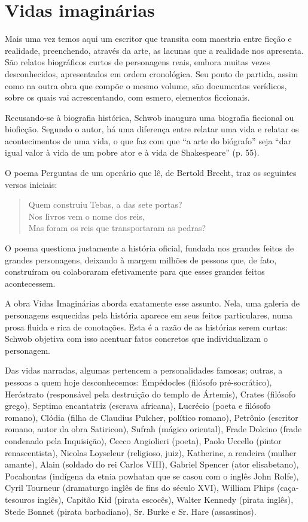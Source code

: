 \documentclass[12pt]{extarticle}
\begin{document}
\section{Vidas imaginárias}

Mais uma vez temos aqui um escritor que transita com maestria entre
ficção e realidade, preenchendo, através da arte, as lacunas que a
realidade nos apresenta. São relatos biográficos curtos de personagens
reais, embora muitas vezes desconhecidos, apresentados em ordem
cronológica. Seu ponto de partida, assim como na outra obra que compõe o
mesmo volume, são documentos verídicos, sobre os quais vai
acrescentando, com esmero, elementos ficcionais.

Recusando-se à biografia histórica, Schwob inaugura uma biografia
ficcional ou bioficção. Segundo o autor, há uma diferença entre relatar
uma vida e relatar os acontecimentos de uma vida, o que faz com que ``a
arte do biógrafo'' seja ``dar igual valor à vida de um pobre ator e à
vida de Shakespeare'' (p. 55).

O poema Perguntas de um operário que lê, de Bertold Brecht, traz os
seguintes versos iniciais:

\begin{verse}
Quem construiu Tebas, a das sete portas?\\
Nos livros vem o nome dos reis,\\
Mas foram os reis que transportaram as pedras?\\
\end{verse}

O poema questiona justamente a história oficial, fundada nos grandes
feitos de grandes personagens, deixando à margem milhões de pessoas que,
de fato, construíram ou colaboraram efetivamente para que esses grandes
feitos acontecessem.

A obra Vidas Imaginárias aborda exatamente esse assunto. Nela, uma
galeria de personagens esquecidas pela história aparece em seus feitos
particulares, numa prosa fluida e rica de conotações. Esta é a razão de
as histórias serem curtas: Schwob objetiva com isso acentuar fatos
concretos que individualizam o personagem.

Das vidas narradas, algumas pertencem a personalidades famosas; outras,
a pessoas a quem hoje desconhecemos: Empédocles (filósofo
pré-socrático), Heróstrato (responsável pela destruição do templo de
Ártemis), Crates (filósofo grego), Septima encantatriz (escrava
africana), Lucrécio (poeta e filósofo romano), Clódia (filha de Claudius
Pulcher, político romano), Petrônio (escritor romano, autor da obra
Satiricon), Sufrah (mágico oriental), Frade Dolcino (frade condenado
pela Inquisição), Cecco Angiolieri (poeta), Paolo Uccello (pintor
renascentista), Nicolas Loyseleur (religioso, juiz), Katherine, a
rendeira (mulher amante), Alain (soldado do rei Carlos VIII), Gabriel
Spencer (ator elisabetano), Pocahontas (indígena da etnia powhatan que
se casou com o inglês John Rolfe), Cyril Tourneur (dramaturgo inglês de
fins do século XVI), William Phips (caça-tesouros inglês), Capitão Kid
(pirata escocês), Walter Kennedy (pirata inglês), Stede Bonnet (pirata
barbadiano), Sr. Burke e Sr. Hare (assassinos).
\end{document}
